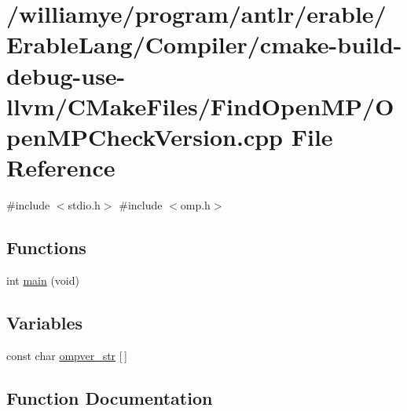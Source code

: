 \hypertarget{use-llvm_2_c_make_files_2_find_open_m_p_2_open_m_p_check_version_8cpp}{}\section{/williamye/program/antlr/erable/\+Erable\+Lang/\+Compiler/cmake-\/build-\/debug-\/use-\/llvm/\+C\+Make\+Files/\+Find\+Open\+M\+P/\+Open\+M\+P\+Check\+Version.cpp File Reference}
\label{use-llvm_2_c_make_files_2_find_open_m_p_2_open_m_p_check_version_8cpp}
{\ttfamily \#include $<$stdio.\+h$>$}\newline
{\ttfamily \#include $<$omp.\+h$>$}\newline
\subsection*{Functions}
\begin{DoxyCompactItemize}
\item 
int \mbox{\hyperlink{use-llvm_2_c_make_files_2_find_open_m_p_2_open_m_p_check_version_8cpp_a840291bc02cba5474a4cb46a9b9566fe}{main}} (void)
\end{DoxyCompactItemize}
\subsection*{Variables}
\begin{DoxyCompactItemize}
\item 
const char \mbox{\hyperlink{use-llvm_2_c_make_files_2_find_open_m_p_2_open_m_p_check_version_8cpp_af60b110d3c4507a1d6ffd66d846f1c58}{ompver\+\_\+str}} \mbox{[}$\,$\mbox{]}
\end{DoxyCompactItemize}


\subsection{Function Documentation}
\mbox{\label{use-llvm_2_c_make_files_2_find_open_m_p_2_open_m_p_check_version_8cpp_a840291bc02cba5474a4cb46a9b9566fe}} 

